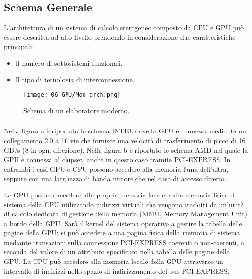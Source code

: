 \subsection{Schema Generale}

L'architettura di un sistema di calcolo eterogeneo composto da CPU e GPU può essere descritta ad alto livello prendendo in considerazione due caratteristiche principali: 
\begin{itemize}
  \item Il numero di sottosistemi funzionali. 
  \item Il tipo di tecnologia di interconnessione.
\end{itemize}

\begin{figure}[h]
    \centering
    \texttt{[image: 06-GPU/Mod\_arch.png]}
    \caption{Schema di un elaboratore moderno.}
\end{figure}


\subsubsection{}

Nella figura a è riportato lo schema INTEL dove la GPU è connessa mediante un collegamento  2.0 a 16 vie che fornisce una velocità di trasferimento di picco di 16 GB/s (8 in ogni direzione). Nella figura b è riportato lo schema AMD nel quale la GPU è connessa al chipset, anche in questo caso tramite PCI-EXPRESS. In entrambi i casi GPU e CPU possono accedere alla memoria l'una dell'altra, seppure con una larghezza di banda minore che nel caso di accesso diretto. 

Le GPU possono accedere alla propria memoria locale e alla memoria fisica di sistema della CPU utilizzando indirizzi virtuali che vengono tradotti da un'unità di calcolo dedicata di gestione della memoria (MMU, Memory Management Unit) a bordo della GPU. Sarà il kernel del sistema operativo a gestire la tabella delle pagine della GPU: si può accedere a una pagina fisica della memoria di sistema mediante transazioni sulla connessione PCI-EXPRESS coerenti o non-coerenti, a seconda del valore di un attributo specificato nella tabella delle pagine della GPU. La CPU può accedere alla memoria locale della GPU attraverso un intervallo di indirizzi nello spazio di indirizzamento del bus PCI-EXPRESS.

